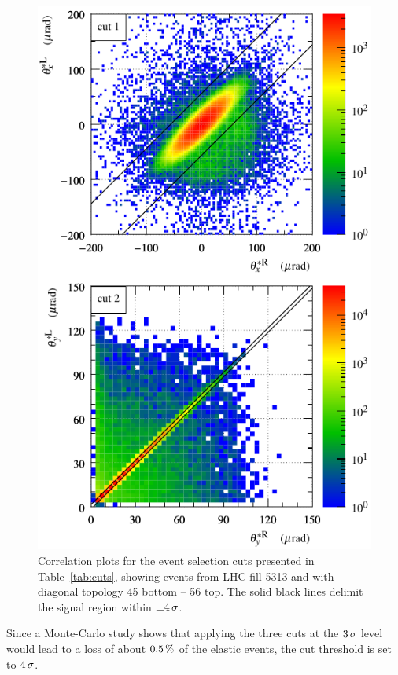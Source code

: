 \begin{figure}
\begin{center}
\includegraphics{fig/cut_example.pdf}
\caption{%
Correlation plots for the event selection cuts presented in Table~\ref{tab:cuts}, showing events from LHC fill 5313 and with diagonal topology 45 bottom -- 56 top. The solid black lines delimit the signal region within $\pm 4\,{\rm \sigma}$.
}
\label{fig:cuts}
\end{center}
\end{figure}

Since a Monte-Carlo study shows that applying the three cuts at the $3\,{\rm \sigma}$ level would lead to a loss of about $0.5\,{\rm \%}$ of the elastic events, the cut threshold is set to $4\,{\rm \sigma}$.

